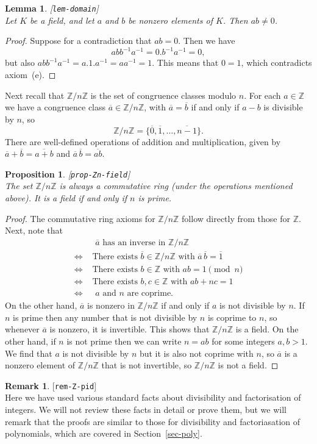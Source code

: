 \documentclass{amsart}
\newcommand{\lbl}[1]{\label{#1}\textup{[\texttt{#1}]}\ \\}
\newcommand{\lbl}{\label}
\newcommand{\Z}         {{\mathbb{Z}}}
\newcommand{\iffa}      {\Leftrightarrow}
\newcommand{\ov}[1]     {\overline{#1}}
\renewcommand{\:}{\colon}
\newtheorem{lemma}[theorem]{Lemma}
\newtheorem{proposition}[theorem]{Proposition}
\theoremstyle{definition}
\newtheorem{remark}[theorem]{Remark}
\begin{document}
\begin{lemma}\lbl{lem-domain}
 Let $K$ be a field, and let $a$ and $b$ be nonzero elements of $K$.
 Then $ab\neq 0$.
\end{lemma}
\begin{proof}
 Suppose for a contradiction that $ab=0$.  Then we have
 \[ abb^{-1}a^{-1} = 0.b^{-1}a^{-1} = 0, \]
 but also $abb^{-1}a^{-1}=a.1.a^{-1}=aa^{-1}=1$.  This means that
 $0=1$, which contradicts axiom~(e).
\end{proof}

Next recall that $\Z/n\Z$ is the set of congruence classes modulo
$n$.  For each $a\in\Z$ we have a congruence class $\ov{a}\in\Z/n\Z$,
with $\ov{a}=\ov{b}$ if and only if $a-b$ is divisible by $n$, so 
\[ \Z/n\Z = \{\ov{0},\ov{1},\dotsc,\ov{n-1}\}. \]
There are well-defined operations of addition and multiplication,
given by $\ov{a}+\ov{b}=\ov{a+b}$ and $\ov{a}\,\ov{b}=\ov{ab}$.  
\begin{proposition}\lbl{prop-Zn-field}
 The set $\Z/n\Z$ is always a commutative ring (under the operations
 mentioned above).  It is a field if and only if $n$ is prime.
\end{proposition}
\begin{proof}
 The commutative ring axioms for $\Z/n\Z$ follow directly from those
 for $\Z$.  Next, note that 
 \begin{align*}
  & \text{ $\ov{a}$ has an inverse in $\Z/n\Z$} \\
  \iffa & \text{ There exists $\ov{b}\in\Z/n\Z$ with
   $\ov{a}\,\ov{b}=\ov{1}$} \\
  \iffa & \text{ There exists $b\in\Z$ with $ab=1\pmod{n}$} \\
  \iffa & \text{ There exists $b,c\in\Z$ with $ab+nc=1$} \\
  \iffa & \text{ $a$ and $n$ are coprime}.
 \end{align*}
 On the other hand, $\ov{a}$ is nonzero in $\Z/n\Z$ if and only if $a$
 is not divisible by $n$.  If $n$ is prime then any number that is
 not divisible by $n$ is coprime to $n$, so whenever $\ov{a}$ is
 nonzero, it is invertible.  This shows that $\Z/n\Z$ is a field.  On
 the other hand, if $n$ is not prime then we can write $n=ab$ for some
 integers $a,b>1$.  We find that $a$ is not divisible by $n$ but it is
 also not coprime with $n$, so $\ov{a}$ is a nonzero element of
 $\Z/n\Z$ that is not invertible, so $\Z/n\Z$ is not a field.
\end{proof}
\begin{remark}\lbl{rem-Z-pid}
 Here we have used various standard facts about divisibility and
 factorisation of integers.  We will not review these facts in detail
 or prove them, but we will remark that the proofs are similar to
 those for divisibility and factoriasation of polynomials, which are
 covered in Section~\ref{sec-poly}.
\end{remark}
\end{document}
